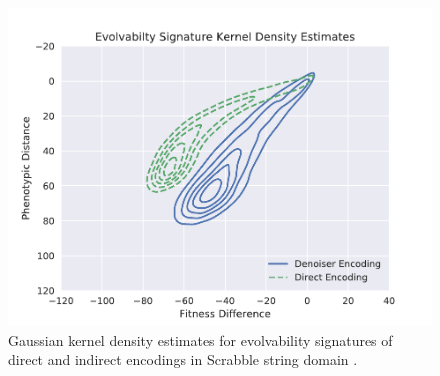 \begin{figure}
  \includegraphics[width=0.8\linewidth]{img/results/scrabble_es_kde}
  \caption{
    Gaussian kernel density estimates for evolvability signatures of direct and indirect encodings in Scrabble string domain \cite{tarapore2015evolvability}.
  }\label{fig:scrabble_es_kde}
\end{figure}
